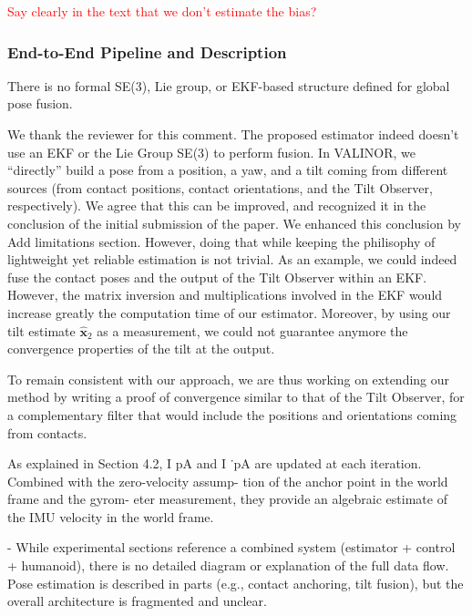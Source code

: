 \textcolor{red}{Say clearly in the text that we don't estimate the bias?}

 

\subsubsection{End-to-End Pipeline and Description}




\begin{revquote}\hypertarget{CommentSe3Fusion}{}
There is no formal SE(3), Lie group, or EKF-based structure defined for global pose fusion.
\end{revquote}


We thank the reviewer for this comment. The proposed estimator indeed doesn't use an EKF or the Lie Group SE(3) to perform fusion. In VALINOR, we ``directly'' build a pose from a position, a yaw, and a tilt coming from different sources (from contact positions, contact orientations, and the Tilt Observer, respectively). We agree that this can be improved, and recognized it in the conclusion of the initial submission of the paper. We enhanced this conclusion by \alert{Add limitations section}. However, doing that while keeping the philisophy of lightweight yet reliable estimation is not trivial. 
As an example, we could indeed fuse the contact poses and the output of the Tilt Observer within an EKF. However, the matrix inversion and multiplications involved in the EKF would increase greatly the computation time of our estimator. Moreover, by using our tilt estimate $\hat{\boldsymbol{x}}_{2}$ as a measurement, we could not guarantee anymore the convergence properties of the tilt at the output.

To remain consistent with our approach, we are thus working on extending our method by writing a proof of convergence similar to that of the Tilt Observer, for a complementary filter that would include the positions and orientations coming from contacts. 

\color{red}
As explained in Section 4.2, I pA and I ˙pA are updated at
each iteration. Combined with the zero-velocity assump-
tion of the anchor point in the world frame and the gyrom-
eter measurement, they provide an algebraic estimate of
the IMU velocity in the world frame.
\color{black}


\begin{revquote}
- While experimental sections reference a combined system (estimator + control + humanoid), there is no detailed diagram or explanation of the full data flow. Pose estimation is described in parts (e.g., contact anchoring, tilt fusion), but the overall architecture is fragmented and unclear.
\end{revquote}


